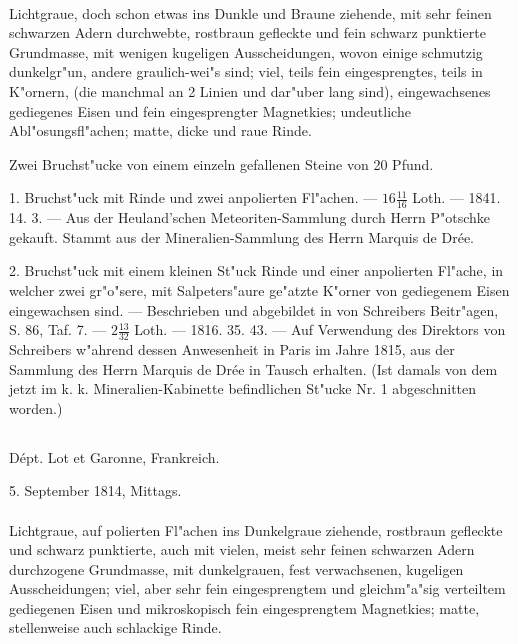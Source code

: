 \documentclass[a4paper, 11pt, oneside, polutonikogreek, german]{article}
\begin{document}
\paragraph{}
Lichtgraue, doch schon etwas ins Dunkle und Braune ziehende, mit sehr feinen schwarzen Adern durchwebte, rostbraun gefleckte und fein schwarz punktierte Grundmasse, mit wenigen kugeligen Ausscheidungen, wovon einige schmutzig dunkelgr"un, andere graulich-wei"s sind; viel, teils fein eingesprengtes, teils in K"ornern, (die manchmal an 2 Linien und dar"uber lang sind), eingewachsenes gediegenes Eisen und fein eingesprengter Magnetkies; undeutliche Abl"osungsfl"achen; matte, dicke und raue Rinde.

Zwei Bruchst"ucke von einem einzeln gefallenen Steine von 20 Pfund.

1. Bruchst"uck mit Rinde und zwei anpolierten Fl"achen. --- $16\frac{11}{16}$ Loth. --- 1841. 14. 3. --- Aus der Heuland'schen Meteoriten-Sammlung durch Herrn P"otschke gekauft. Stammt aus der Mineralien-Sammlung des Herrn Marquis de Drée.

2. Bruchst"uck mit einem kleinen St"uck Rinde und einer anpolierten Fl"ache, in welcher zwei gr"o"sere, mit Salpeters"aure ge"atzte K"orner von gediegenem Eisen eingewachsen sind. --- Beschrieben und abgebildet in von Schreibers Beitr"agen, S. 86, Taf. 7. --- $2\frac{13}{32}$ Loth. --- 1816. 35. 43. --- Auf Verwendung des Direktors von Schreibers w"ahrend dessen Anwesenheit in Paris im Jahre 1815, aus der Sammlung des Herrn Marquis de Drée in Tausch erhalten. (Ist damals von dem jetzt im k. k. Mineralien-Kabinette befindlichen St"ucke Nr. 1 abgeschnitten worden.)
\subsection{}
\begin{center}

Dépt. Lot et Garonne, Frankreich.

5. September 1814, Mittags.
\end{center}
\paragraph{}
Lichtgraue, auf polierten Fl"achen ins Dunkelgraue ziehende, rostbraun gefleckte und schwarz punktierte, auch mit vielen, meist sehr feinen schwarzen Adern durchzogene Grundmasse, mit dunkelgrauen, fest verwachsenen, kugeligen Ausscheidungen; viel, aber sehr fein eingesprengtem und gleichm"a"sig verteiltem gediegenen Eisen und mikroskopisch fein eingesprengtem Magnetkies; matte, stellenweise auch schlackige Rinde.
\end{document}
